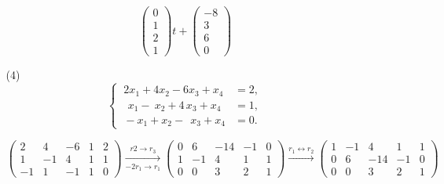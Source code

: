 \documentclass{article}
\begin{document}
\begin{enumerate}
\begin{enumerate}
\[                \left(
                    \begin{array}{ccc}
                        0\\
                        1\\
                        2\\
                        1
                    \end{array}
                \right)
                t+
                \left(
                    \begin{array}{ccc}
                        -8\\
                        3\\
                        6\\
                        0
                    \end{array}
                \right)
            \]
            \item [(4)]
            \[
                \begin{cases}
                    \ 2x_1 +4x_2 -6x_3 +x_4&=2,\\
                    \ \ \,x_1 -\ x_2 +4 \, x_3 +x_4&=1,\\
                    \ -x_1+x_2-\ \ x_3+x_4&=0.
                \end{cases}
            \]

            $
            \begin{pmatrix}
                2& 4& -6& 1& 2\\
                1& -1& 4& 1& 1\\
                -1& 1& -1& 1& 0
            \end{pmatrix}
            \xrightarrow[-2r_1 \rightarrow r_1]{r2 \rightarrow r_3}
            \begin{pmatrix}
                0& 6& -14& -1& 0\\
                1& -1& 4& 1& 1\\
                0& 0& 3& 2& 1
            \end{pmatrix}
            \xrightarrow{r_1 \leftrightarrow r_2}
            \begin{pmatrix}
                1& -1& 4& 1& 1\\
                0& 6& -14& -1& 0\\
                0& 0& 3& 2& 1
            \end{pmatrix}
            $


\end{enumerate}
\end{enumerate}
\end{document}
